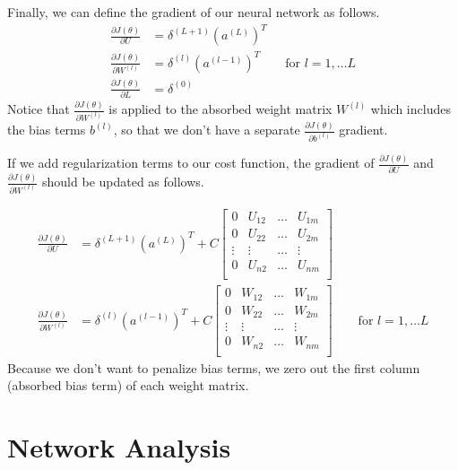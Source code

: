 \documentclass[letterpaper]{article}
\begin{document}
Finally, we can define the gradient of our neural network as follows.
\begin{equation}
\begin{split}
\frac{\partial J(\theta)}{\partial U} &
= \delta^{(L+1)} (a^{(L)})^T \\
\frac{\partial J(\theta)}{\partial W^{(l)}} &
= \delta^{(l)}(a^{(l-1)})^T \qquad \textrm{for } l = 1, \dots L \\
\frac{\partial J(\theta)}{\partial L} &
= \delta^{(0)}
\end{split}
\end{equation}
Notice that $\frac{\partial J(\theta)}{\partial W^{(l)}}$ is applied to the absorbed weight matrix $W^{(l)}$ which includes the bias terms $b^{(l)}$, so that we don't have a separate $\frac{\partial J(\theta)}{\partial b^{(l)}}$ gradient.

\vspace{0.1cm}

If we add regularization terms to our cost function, the gradient of $\frac{\partial J(\theta)}{\partial U}$ and  $\frac{\partial J(\theta)}{\partial W^{(l)}}$ should be updated as follows.

\begin{equation*}
\begin{split}
\frac{\partial J(\theta)}{\partial U} &
= \delta^{(L+1)} (a^{(L)})^T + C 
\begin{bmatrix}
0 & U_{12} & \dots & U_{1m} \\
0 & U_{22} & \dots & U_{2m} \\
\vdots & \vdots & \dots & \vdots  \\
0 & U_{n2} & \dots & U_{nm} \\
\end{bmatrix} \\
\frac{\partial J(\theta)}{\partial W^{(l)}} &
= \delta^{(l)}(a^{(l-1)})^T + C
\begin{bmatrix}
0 & W_{12} & \dots & W_{1m} \\
0 & W_{22} & \dots & W_{2m} \\
\vdots & \vdots & \dots & \vdots  \\
0 & W_{n2} & \dots & W_{nm} \\
\end{bmatrix}
\qquad \textrm{for } l = 1, \dots L
\end{split}
\end{equation*}
Because we don't want to penalize bias terms, we zero out the first column (absorbed bias term) of each weight matrix.
\section{Network Analysis}
\end{document}

